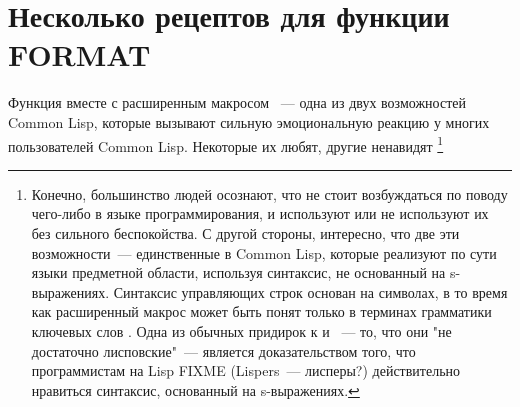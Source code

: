 \chapter{Несколько рецептов для функции FORMAT}
\label{ch:18}

Функция  вместе с расширенным макросом ~--- одна из двух
возможностей Common Lisp, которые вызывают сильную эмоциональную реакцию у многих
пользователей Common Lisp. Некоторые их любят, другие ненавидят \footnote{Конечно,
  большинство людей осознают, что не стоит возбуждаться по поводу чего-либо в языке
  программирования, и используют или не используют их без сильного беспокойства. С другой
  стороны, интересно, что две эти возможности~--- единственные в Common Lisp, которые
  реализуют по сути языки предметной области, используя синтаксис, не основанный на
  s-выражениях. Синтаксис управляющих строк  основан на символах, в то время
  как расширенный макрос  может быть понят только в терминах грамматики
  ключевых слов . Одна из обычных придирок к  и ~--- то,
  что они "не достаточно лисповские"~--- является доказательством того, что программистам на
  Lisp FIXME (Lispers~--- лисперы?)  действительно нравиться синтаксис, основанный на
  s-выражениях.}

